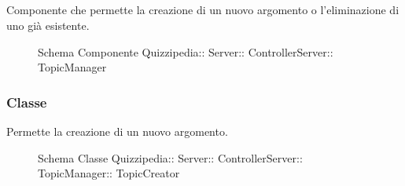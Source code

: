 \subsection{}
Componente che permette la creazione di un nuovo argomento o l'eliminazione di uno già esistente.
\begin{figure}[H]
\centering
\noindent{}
\caption[Schema Componente Quizzipedia::Server::ControllerServer::TopicManager]{Schema Componente Quizzipedia:: Server:: ControllerServer:: TopicManager}
\end{figure}
\subsubsection{Classe }
Permette la creazione di un nuovo argomento.
\begin{figure}[H]
\centering
\noindent{}
\caption[Schema Classe TopicCreator]{Schema Classe Quizzipedia:: Server:: ControllerServer:: TopicManager:: TopicCreator}
\end{figure}
